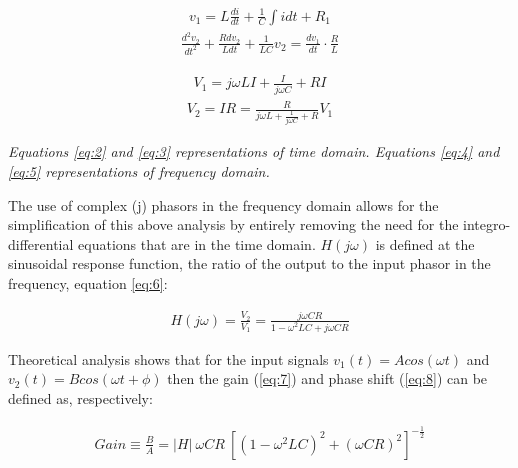 \documentclass[12pt]{article}
\begin{document}
\hspace{2ex}
\begin{minipage}{0.45\textwidth}
    \begin{gather}
        v_1=L\frac{di}{dt}+\frac1C\int idt+R_1\label{eq:2}
    \end{gather}
    \vspace{-1.5em}
    \begin{gather}
        \frac{d^2v_2}{dt^2} + \frac{R dv_2}{L dt} + \frac{1}{LC} v_2 = \frac{dv_1}{dt} \cdot \frac{R}{L}\label{eq:3}
    \end{gather}
\end{minipage}
\hspace{-1.5ex}
\begin{minipage}{0.45\textwidth}
    \begin{gather}
        V_1 = j \omega L I + \frac{I}{j \omega C} + RI\label{eq:4}
    \end{gather}
    \vspace{-1.5em}
    \begin{gather}\label{eq:5}
        V_2 = IR = \frac{R}{j \omega L + \frac{1}{j \omega C} + R} V_1
    \end{gather}
\end{minipage}

\vspace{0.25cm}

\textit{Equations \ref{eq:2} and \ref{eq:3} representations of time domain. Equations \ref{eq:4} and \ref{eq:5} representations of frequency domain.} \cite{UCDlcr}

The use of complex (j) phasors in the frequency domain allows for the simplification of this above analysis by entirely removing
the need for the integro-differential equations that are in the time domain. $H(j \omega)$ is defined at the sinusoidal response function, 
the ratio of the output to the input phasor in the frequency, equation \ref{eq:6}:

\begin{gather} \label{eq:6}
    H (j \omega) = \frac{V_2}{V_1} = \frac{j \omega C R}{1 - \omega^2 L C + j \omega C R}
\end{gather}

Theoretical analysis shows that for the input signals $v_1(t) = Acos( \omega t)$ and $v_2(t) = Bcos(\omega t + \phi)$ then the gain (\ref{eq:7}) and phase shift (\ref{eq:8}) can be defined as, respectively:

\begin{gather} \label{eq:7}
    Gain \equiv \frac{B}{A} = \lvert H \rvert \: \omega CR \: \left[ (1 - \omega^2 LC)^2 + (\omega CR)^2 \right] ^ {- \frac{1}{2}}
\end{gather}
\end{document}
